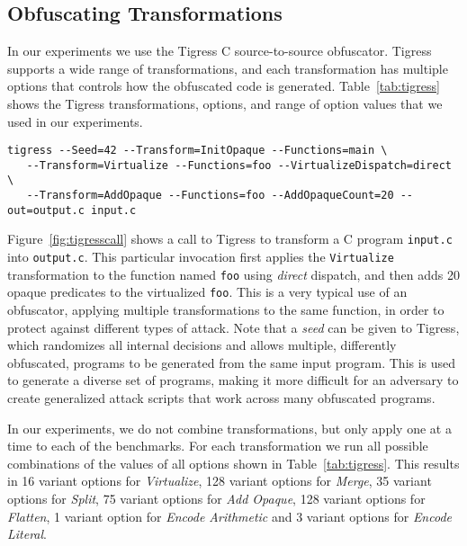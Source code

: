 \subsection{Obfuscating Transformations}



In our experiments we use the Tigress C source-to-source obfuscator. Tigress supports a wide range of transformations, and each transformation has multiple options that controls how the obfuscated code is generated. Table~\ref{tab:tigress} shows the Tigress transformations, options, and range of option values that we used in our experiments.

\begin{figure*}
\begin{center}
\begin{minipage}{12cm}
\begin{lstlisting}[basicstyle=\footnotesize]
tigress --Seed=42 --Transform=InitOpaque --Functions=main \
   --Transform=Virtualize --Functions=foo --VirtualizeDispatch=direct \
   --Transform=AddOpaque --Functions=foo --AddOpaqueCount=20 --out=output.c input.c
\end{lstlisting}
\end{minipage}
\end{center}
\caption{Example Tigress invocation.}
\label{fig:tigresscall}
\end{figure*}

Figure~\ref{fig:tigresscall} shows a  call to Tigress to transform a C program {\tt input.c} into {\tt output.c}. This particular invocation first applies the {\tt Virtualize} transformation to the function named {\tt foo} using {\em direct} dispatch, and then adds 20 opaque predicates to the virtualized {\tt foo}. This is a very typical use of an obfuscator, applying multiple transformations to the same function, in order to protect against different types of attack. Note that a {\em seed} can be given to Tigress, which randomizes all internal decisions and allows multiple, differently obfuscated, programs to be generated from the same input program. This is used to generate a diverse set of programs, making it more difficult for an adversary to create generalized attack scripts that work across many obfuscated programs. 

\CC{AR and JP: are these numbers still correct?}

In our experiments, we do not combine transformations, but only apply one at a time to each of the benchmarks. For each transformation we run all possible  combinations of the values of all options shown in  Table~\ref{tab:tigress}. This results in 16 variant options for \emph{Virtualize}, 128 variant options for \emph{Merge}, 35 variant options for \emph{Split}, 75 variant options for \emph{Add Opaque}, 128 variant options for \emph{Flatten}, 1 variant option for \emph{Encode Arithmetic} and 3 variant options for \emph{Encode Literal}. 

